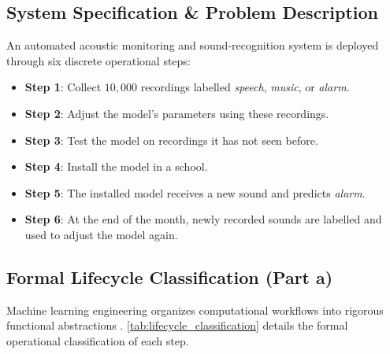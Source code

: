 \documentclass[11pt,a4paper]{article}
\theoremstyle{definition}
\theoremstyle{plain}
\theoremstyle{remark}
\begin{document}
\subsection{System Specification \& Problem Description}
An automated acoustic monitoring and sound-recognition system is deployed through six discrete operational steps:
\begin{itemize}[noitemsep]
    \item \textbf{Step 1}: Collect $10{,}000$ recordings labelled \textit{speech}, \textit{music}, or \textit{alarm}.
    \item \textbf{Step 2}: Adjust the model's parameters using these recordings.
    \item \textbf{Step 3}: Test the model on recordings it has not seen before.
    \item \textbf{Step 4}: Install the model in a school.
    \item \textbf{Step 5}: The installed model receives a new sound and predicts \textit{alarm}.
    \item \textbf{Step 6}: At the end of the month, newly recorded sounds are labelled and used to adjust the model again.
\end{itemize}

\subsection{Formal Lifecycle Classification (Part a)}
Machine learning engineering organizes computational workflows into rigorous functional abstractions \cite{sculley2015hidden}. \cref{tab:lifecycle_classification} details the formal operational classification of each step.
\end{document}
